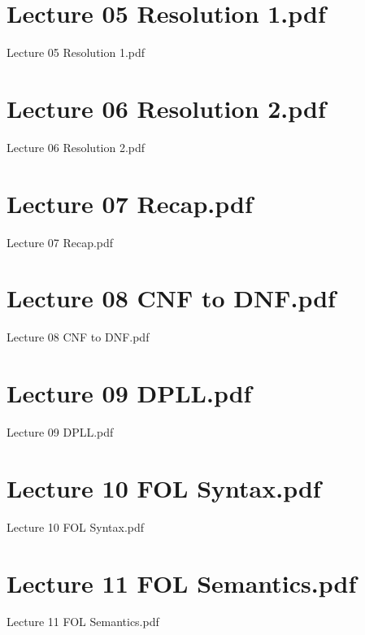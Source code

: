 \documentclass[aspectratio = 43]{beamer}
\begin{document}
\section{Lecture 05 Resolution 1.pdf}
\begin{frame}{Lecture 05 Resolution 1.pdf}
\end{frame}

\section{Lecture 06 Resolution 2.pdf}
\begin{frame}{Lecture 06 Resolution 2.pdf}
\end{frame}

\section{Lecture 07 Recap.pdf}
\begin{frame}{Lecture 07 Recap.pdf}
\end{frame}

\section{Lecture 08 CNF to DNF.pdf}
\begin{frame}{Lecture 08 CNF to DNF.pdf}
\end{frame}

\section{Lecture 09 DPLL.pdf}
\begin{frame}{Lecture 09 DPLL.pdf}
\end{frame}

\section{Lecture 10 FOL Syntax.pdf}
\begin{frame}{Lecture 10 FOL Syntax.pdf}
\end{frame}

\section{Lecture 11 FOL Semantics.pdf}
\begin{frame}{Lecture 11 FOL Semantics.pdf}
\end{frame}

\end{document}
